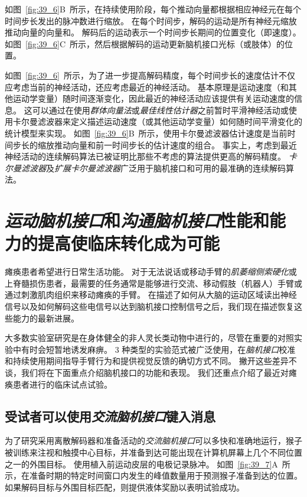 如图~\ref{fig:39_6}B~所示，在持续使用阶段，每个推动向量都根据相应神经元在每个时间步长发出的脉冲数进行缩放。
在每个时间步，解码的运动是所有神经元缩放推动向量的向量和。
解码后的运动表示一个时间步长期间的位置变化（即速度）。
如图~\ref{fig:39_6}C~所示，然后根据解码的运动更新脑机接口光标（或肢体）的位置。


如图~\ref{fig:39_6}~所示，为了进一步提高解码精度，每个时间步长的速度估计不仅应考虑当前的神经活动，还应考虑最近的神经活动。
基本原理是运动速度（和其他运动学变量）随时间逐渐变化，因此最近的神经活动应该提供有关运动速度的信息。 
这可以通过在使用\textit{群体向量法}或\textit{最佳线性估计器}之前暂时平滑神经活动或使用卡尔曼滤波器来定义描述运动速度（或其他运动学变量）如何随时间平滑变化的统计模型来实现。
如图~\ref{fig:39_6}B~所示，使用卡尔曼滤波器估计速度是当前时间步长的缩放推动向量和前一时间步长的估计速度的组合。
事实上，考虑到最近神经活动的连续解码算法已被证明比那些不考虑的算法提供更高的解码精度。
\textit{卡尔曼滤波器}及\textit{扩展卡尔曼滤波器}广泛用于脑机接口和可用的最准确的连续解码算法。



\section{\textit{运动脑机接口}和\textit{沟通脑机接口}性能和能力的提高使临床转化成为可能}

瘫痪患者希望进行日常生活功能。
对于无法说话或移动手臂的\textit{肌萎缩侧索硬化}或上脊髓损伤患者，最需要的任务通常是能够进行交流、移动假肢（机器人）手臂或通过刺激肌肉组织来移动瘫痪的手臂。
在描述了如何从大脑的运动区域读出神经信号以及如何解码这些电信号以达到脑机接口控制信号之后，我们现在描述恢复这些能力的最新进展。


大多数实验室研究是在身体健全的非人灵长类动物中进行的，尽管在重要的对照实验中有时会短暂地诱发麻痹。
3 种类型的实验范式被广泛使用，在\textit{脑机接口}校准和持续使用期间指导手臂行为和提供视觉反馈的确切方式不同。
撇开这些差异不谈，我们将在下面重点介绍脑机接口的功能和表现。
我们还重点介绍了最近对瘫痪患者进行的临床试点试验。



\subsection{受试者可以使用\textit{交流脑机接口}键入消息}

为了研究采用离散解码器和准备活动的\textit{交流脑机接口}可以多快和准确地运行，猴子被训练来注视和触摸中心目标，并准备到达可能出现在计算机屏幕上几个不同位置之一的外围目标。
使用植入前运动皮层的电极记录脉冲。
如图~\ref{fig:39_7}A~所示，在准备时期的特定时间窗口内发生的峰值数量用于预测猴子准备到达的位置。
如果解码目标与外围目标匹配，则提供液体奖励以表明试验成功。

